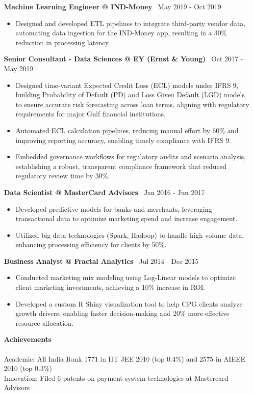 \documentclass[a4paper,10pt]{article}
\newcommand{\sectionheader}[1]{%
    \textbf{\LARGE #1}\\[-0.5ex]
    \textbf{\LARGE \underline{\hspace{\textwidth}}}\\[2ex]
}
\newcommand{\companyheader}[2]{%
    \vspace{1ex}
    \textbf{\large #1} \hfill \faCalendar \, #2
    \vspace{0.5ex}
}
\begin{document}
\companyheader{Machine Learning Engineer @ IND-Money}{May 2019 - Oct 2019}
\begin{itemize}
    \item Designed and developed ETL pipelines to integrate third-party vendor data, automating data ingestion for the IND-Money app, resulting in a 30\% reduction in processing latency.
\end{itemize}

\companyheader{Senior Consultant - Data Sciences @ EY (Ernst \& Young)}{Oct 2017 - May 2019}
\begin{itemize}
    \item Designed time-variant Expected Credit Loss (ECL) models under IFRS 9, building Probability of Default (PD) and Loss Given Default (LGD) models to ensure accurate risk forecasting across loan terms, aligning with regulatory requirements for major Gulf financial institutions.
    \item Automated ECL calculation pipelines, reducing manual effort by 60\% and improving reporting accuracy, enabling timely compliance with IFRS 9.
    \item Embedded governance workflows for regulatory audits and scenario analysis, establishing a robust, transparent compliance framework that reduced regulatory review time by 30\%.
\end{itemize}

\companyheader{Data Scientist @ MasterCard Advisors}{Jan 2016 - Jun 2017}
\begin{itemize}
    \item Developed predictive models for banks and merchants, leveraging transactional data to optimize marketing spend and increase engagement.
    \item Utilized big data technologies (Spark, Hadoop) to handle high-volume data, enhancing processing efficiency for clients by 50\%.
\end{itemize}

\companyheader{Business Analyst @ Fractal Analytics}{Jul 2014 - Dec 2015}
\begin{itemize}
    \item Conducted marketing mix modeling using Log-Linear models to optimize client marketing investments, achieving a 10\% increase in ROI.
    \item Developed a custom R Shiny visualization tool to help CPG clients analyze growth drivers, enabling faster decision-making and 20\% more effective resource allocation.
\end{itemize}

\vspace{4mm}

\sectionheader{Achievements}
Academic: All India Rank 1771 in IIT JEE 2010 (top 0.4\%) and 2575 in AIEEE 2010 (top 0.3\%) \\
Innovation: Filed 6 patents on payment system technologies at Mastercard Advisors
\end{document}
